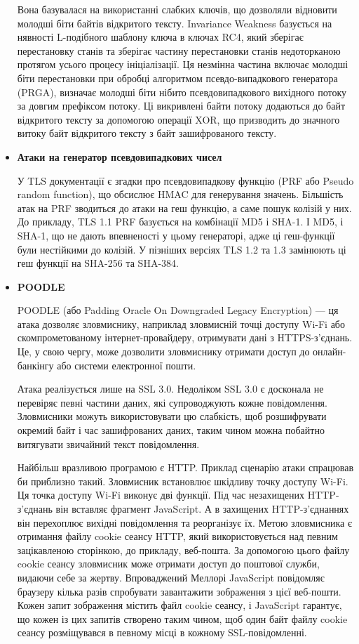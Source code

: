 \begin{itemize}
    Вона базувалася на використанні слабких ключів, що дозволяли відновити молодші біти байтів відкритого тексту. Invariance Weakness базується на нявності L-подібного шаблону ключа в ключах RC4, який зберігає перестановку станів та зберігає частину перестановки станів недоторканою протягом усього процесу ініціалізації. Ця незмінна частина включає молодші біти перестановки при обробці алгоритмом псевдо-випадкового генератора (PRGA), визначає молодші біти нібито псевдовипадкового вихідного потоку за довгим префіксом потоку. Ці викривлені байти потоку додаються до байт відкритого тексту за допомогою операції XOR, що призводить до значного витоку байт відкритого тексту з байт зашифрованого тексту.
    
    \item \textbf{Атаки на генератор псевдовипадкових чисел}

    У TLS документації є згадки про псевдовипадкову функцію (PRF або Pseudo random function), що обсислює HMAC для генерування значень. Більшість атак на PRF зводиться до атаки на геш функцію, а саме пошук колізій у них. До прикладу, TLS 1.1 PRF базується на комбінації MD5 і SHA-1. І MD5, і SHA-1, що не дають впевненості у цьому генераторі, адже ці геш-функції були нестійкими до колізій. У пізніших версіях TLS 1.2 та 1.3 замінюють ці геш функції на SHA-256 та SHA-384.

    \item \textbf{POODLE}

    POODLE (або Padding Oracle On Downgraded Legacy Encryption) — ця атака дозволяє зловмиснику, наприклад зловмисній точці доступу Wi-Fi або скомпрометованому інтернет-провайдеру, отримувати дані з HTTPS-з’єднань. Це, у свою чергу, може дозволити зловмиснику отримати доступ до онлайн-банкінгу або системи електронної пошти. 


    Атака реалізується лише на SSL 3.0. Недоліком SSL 3.0 є досконала не перевіряє певні частини даних, які супроводжують кожне повідомлення. Зловмисники можуть використовувати цю слабкість, щоб розшифрувати окремий байт і час зашифрованих даних, таким чином можна побайтно витягувати звичайний текст повідомлення.


    Найбільш вразливою програмою є HTTP. Приклад сценарію атаки спрацював би приблизно такий. Зловмисник встановлює шкідливу точку доступу Wi-Fi. Ця точка доступу Wi-Fi виконує дві функції. Під час незахищених HTTP-з’єднань він вставляє фрагмент JavaScript. А в захищених HTTP-з’єднаннях він перехоплює вихідні повідомлення та реорганізує їх. Метою зловмисника є отримання файлу cookie сеансу HTTP, який використовується над певним зацікавленою сторінкою, до прикладу, веб-пошта. За допомогою цього файлу cookie сеансу зловмисник може отримати доступ до поштової служби, видаючи себе за жертву. Впроваджений Меллорі JavaScript повідомляє браузеру кілька разів спробувати завантажити зображення з цієї веб-пошти. Кожен запит зображення містить файл cookie сеансу, і JavaScript гарантує, що кожен із цих запитів створено таким чином, щоб один байт файлу cookie сеансу розміщувався в певному місці в кожному SSL-повідомленні.


\end{itemize}
